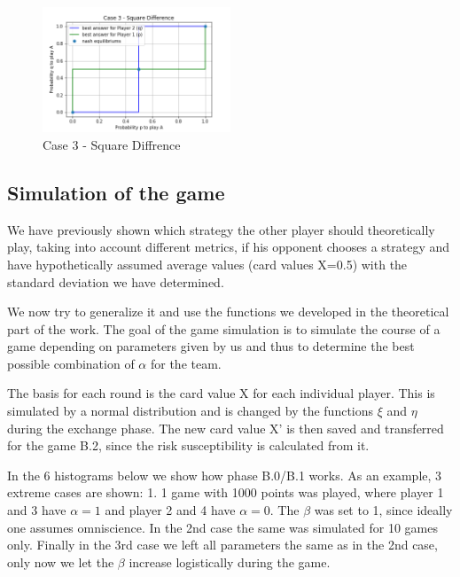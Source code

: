 \begin{figure}[!ht]
    \centering
    \includegraphics[width=0.5\textwidth]{Bilder/5_diff}
    \caption{Case 3 - Square Diffrence}
    \label{fig:meine-grafik}
\end{figure}
\subsection{Simulation of the game}
We have previously shown which strategy the other player should theoretically play, taking into account different metrics, if his opponent chooses a strategy and have hypothetically assumed average values (card values X=0.5) with the standard deviation we have determined.

We now try to generalize it and use the functions we developed in the theoretical part of the work. The goal of the game simulation is to simulate the course of a game depending on parameters given by us and thus to determine the best possible combination of $\alpha$ for the team.

The basis for each round is the card value X for each individual player. This is simulated by a normal distribution and is changed by the functions $\xi$ and $\eta$ during the exchange phase. The new card value X' is then saved and transferred for the game B.2, since the risk susceptibility is calculated from it.

In the 6 histograms below we show how phase B.0/B.1 works. As an example, 3 extreme cases are shown: 1. 1 game with 1000 points was played, where player 1 and 3 have $\alpha = 1$ and player 2 and 4 have $\alpha=0$. The $\beta$ was set to 1, since ideally one assumes omniscience. In the 2nd case the same was simulated for 10 games only. Finally in the 3rd case we left all parameters the same as in the 2nd case, only now we let the $\beta$ increase logistically during the game.

